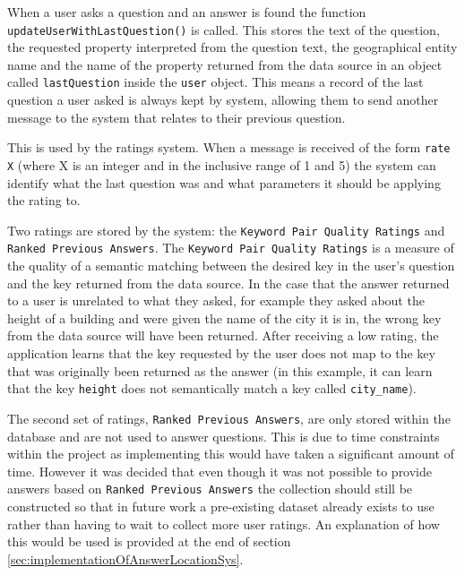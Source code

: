 \documentclass[authoryearcitations]{UoYCSproject}
\begin{document}
When a user asks a question and an answer is found the function \texttt{updateUserWithLastQuestion()} is called. This stores the text of the question, the requested property interpreted from the question text, the geographical entity name and the name of the property returned from the data source in an object called \texttt{lastQuestion} inside the \texttt{user} object. This means a record of the last question a user asked is always kept by system, allowing them to send another message to the system that relates to their previous question. 

This is used by the ratings system. When a message is received of the form \texttt{rate X} (where X is an integer and in the inclusive range of 1 and 5) the system can identify what the last question was and what parameters it should be applying the rating to.

Two ratings are stored by the system: the \texttt{Keyword Pair Quality Ratings} and \texttt{Ranked Previous Answers}. The \texttt{Keyword Pair Quality Ratings} is a measure of the quality of a semantic matching between the desired key in the user's question and the key returned from the data source. In the case that the answer returned to a user is unrelated to what they asked, for example they asked about the height of a building and were given the name of the city it is in, the wrong key from the data source will have been returned. After receiving a low rating, the application learns that the key requested by the user does not map to the key that was originally been returned as the answer (in this example, it can learn that the key \texttt{height} does not semantically match a key called \texttt{city\_name}).

The second set of ratings, \texttt{Ranked Previous Answers}, are only stored within the database and are not used to answer questions. This is due to time constraints within the project as implementing this would have taken a significant amount of time. However it was decided that even though it was not possible to provide answers based on \texttt{Ranked Previous Answers} the collection should still be constructed so that in future work a pre-existing dataset already exists to use rather than having to wait to collect more user ratings. An explanation of how this would be used is provided at the end of section \ref{sec:implementationOfAnswerLocationSys}.
\end{document}

